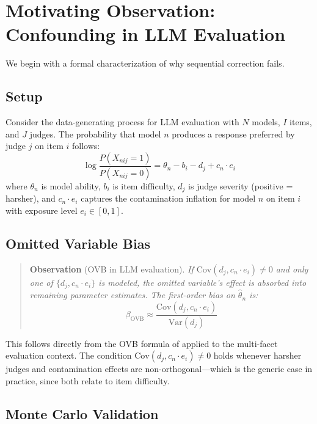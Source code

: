 \documentclass[letterpaper,11pt]{article}
\begin{document}
\section{Motivating Observation: Confounding in LLM Evaluation}
\label{sec:observation}

We begin with a formal characterization of why sequential correction fails.

\subsection{Setup}

Consider the data-generating process for LLM evaluation with $N$ models, $I$ items, and $J$ judges. The probability that model $n$ produces a response preferred by judge $j$ on item $i$ follows:
\begin{equation}
\log\frac{P(X_{nij}=1)}{P(X_{nij}=0)} = \theta_n - b_i - d_j + c_n \cdot e_i
\label{eq:dgp}
\end{equation}
where $\theta_n$ is model ability, $b_i$ is item difficulty, $d_j$ is judge severity (positive = harsher), and $c_n \cdot e_i$ captures the contamination inflation for model $n$ on item $i$ with exposure level $e_i \in [0,1]$.

\subsection{Omitted Variable Bias}

\begin{quote}
\textbf{Observation} (OVB in LLM evaluation). \textit{If $\text{Cov}(d_j, c_n \cdot e_i) \neq 0$ and only one of $\{d_j, c_n \cdot e_i\}$ is modeled, the omitted variable's effect is absorbed into remaining parameter estimates. The first-order bias on $\hat{\theta}_n$ is:}
\begin{equation}
\beta_{\text{OVB}} \approx \frac{\text{Cov}(d_j, c_n \cdot e_i)}{\text{Var}(d_j)}
\end{equation}
\end{quote}

This follows directly from the OVB formula of \citet{angrist2009mostly} applied to the multi-facet evaluation context. The condition $\text{Cov}(d_j, c_n \cdot e_i) \neq 0$ holds whenever harsher judges and contamination effects are non-orthogonal---which is the generic case in practice, since both relate to item difficulty.

\subsection{Monte Carlo Validation}
\end{document}
